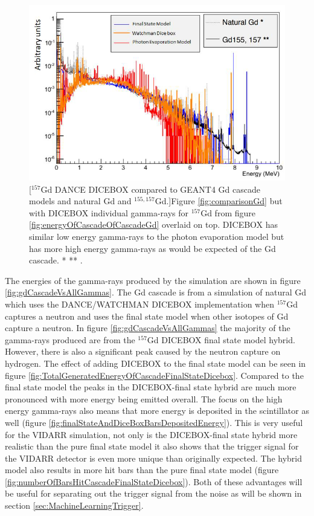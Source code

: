 \begin{figure}[!h]
 \centering
 \includegraphics[width=0.7\linewidth]{Chapter4/Figs/Raster/gadolinium/comparisonAndDiceBoxGd.png}
 [$^{157}$Gd DANCE DICEBOX compared to GEANT4 Gd cascade models and natural Gd and $^{155,157}$Gd.]{Figure \ref{fig:comparisonGd} \cite{YuChen_2015} but with DICEBOX individual gamma-rays for $^{157}$Gd from figure \ref{fig:energyOfCascadeOfCascadeGd} overlaid on top. DICEBOX has similar low energy gamma-rays to the photon evaporation model but has more high energy gamma-rays as would be expected of the Gd cascade. * \cite{kandlakunta_2012} ** \cite{bollinger_1970}.}
 \label{fig:comparisonAndDiceBoxGd}
\end{figure}

The energies of the gamma-rays produced by the simulation are shown in figure \ref{fig:gdCascadeVsAllGammas}. The Gd cascade is from a simulation of natural Gd which uses the DANCE/WATCHMAN DICEBOX implementation when $^{157}$Gd captures a neutron and uses the final state model when other isotopes of Gd capture a neutron. In figure \ref{fig:gdCascadeVsAllGammas} the majority of the gamma-rays produced are from the $^{157}$Gd DICEBOX final state model hybrid. However, there is also a significant peak caused by the neutron capture on hydrogen. The effect of adding DICEBOX to the final state model can be seen in figure \ref{fig:TotalGeneratedEnergyOfCascadeFinalStateDicebox}. Compared to the final state model the peaks in the DICEBOX-final state hybrid are much more pronounced with more energy being emitted overall. The focus on the high energy gamma-rays also means that more energy is deposited in the scintillator as well (figure \ref{fig:finalStateAndDiceBoxBarsDepositedEnergy}). This is very useful for the VIDARR simulation, not only is the DICEBOX-final state hybrid more realistic than the pure final state model it also shows that the trigger signal for the VIDARR detector is even more unique than originally expected. The hybrid model also results in more hit bars than the pure final state model (figure \ref{fig:numberOfBarsHitCascadeFinalStateDicebox}). Both of these advantages will be useful for separating out the trigger signal from the noise as will be shown in section \ref{sec:MachineLearningTrigger}.

